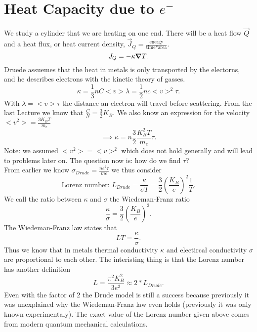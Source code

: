 \documentclass{report}
\begin{document}
\section{Heat Capacity due to $e^-$}
We study a cylinder that we are heating on one end. There will be a heat flow $\vec{Q}$ and a heat flux, or heat current density, $\vec{J}_Q = \frac{\text{energy}}{\text{time} * \text{area}}$.\[
J_Q = - \kappa \grad T
.\] Druede assuemes that the heat in metals is only transported by the electorns, and he describes electrons with the kinetic theory of gasses. \[
\kappa = \frac{1}{3} n C <v> \lambda = \frac{1}{2} n c <v>^2 \tau
.\] With $\lambda = <v> \tau$ the distance an electron will travel before scattering. From the last Lecture we know that $\frac{C}{N}= \frac{3}{2} K_B$. We also know an expression for the velocity $<v^2> = \frac{3K_BT}{m_e}$ \[
\implies \kappa = n \frac{3}{2} \frac{K_B^2T}{m_e} \tau
.\] Note: we assumed $<v^2> = <v>^2$ which does not hold generally and will lead to problems later on. The question now is: how do we find $\tau$?\\
From earlier we know $\sigma_{Drude} = \frac{ne^2\tau}{me}$ we thus consider \[
	\text{Lorenz number: } L_{Drude} = \frac{\kappa}{\sigma T} = \frac{3}{2} \left( \frac{K_B}{e} \right)^2 \frac{1}{T}
.\] We call the ratio between $\kappa$ and $\sigma$ the Wiedeman-Franz ratio \[
\frac{\kappa}{\sigma} = \frac{3}{2} \left( \frac{K_B}{e} \right) ^2
.\] The Wiedeman-Franz law states that \[
LT = \frac{\kappa}{\sigma}
.\] Thus we know that in metals thermal conductivity $\kappa$ and electircal conductivity $\sigma$ are proportional to each other. The interisting thing is that the Lorenz number has another definition \[
L = \frac{\pi^2 K_B^2}{3 e^2} \approx 2*L_{Drude}
.\] Even with the factor of $2$ the Drude model is still a success because previously it was unexplained why the Wiedeman-Franz law even holds (previously it was only known experimentaly). The exact value of the Lorenz number given above comes from modern quantum mechanical calculations.
\end{document}
